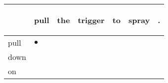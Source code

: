 \documentclass[landscape]{article}
\newcommand{\ssp}{\hspace{2pt}}
\newcommand{\mex}{\cellcolor{g}$\bullet$}
\begin{document}
\noindent\begin{tabular}{|l|p{10pt}|p{10pt}|p{10pt}|p{10pt}|p{10pt}|p{10pt}|}
\hline
&\begin{sideways}\cellcolor{ref0}pull\hspace{12pt}\end{sideways}&\begin{sideways}\cellcolor{ref1}the\hspace{12pt}\end{sideways}&\begin{sideways}\cellcolor{ref2}trigger\hspace{12pt}\end{sideways}&\begin{sideways}\cellcolor{ref3}to\hspace{12pt}\end{sideways}&\begin{sideways}\cellcolor{ref4}spray\hspace{12pt}\end{sideways}&\begin{sideways}\cellcolor{ref5}.\hspace{12pt}\end{sideways}\\
\hline
\ssp \cellcolor{ref0}pull \ssp&\hspace{2pt}\mex&\hspace{2pt}&\hspace{2pt}&\hspace{2pt}&\hspace{2pt}&\hspace{2pt}\\
\hline
\ssp down \ssp&\hspace{2pt}&\hspace{2pt}&\hspace{2pt}&\hspace{2pt}&\hspace{2pt}&\hspace{2pt}\\
\hline
\ssp on \ssp&\hspace{2pt}&\hspace{2pt}&\hspace{2pt}&\hspace{2pt}&\hspace{2pt}&\hspace{2pt}\\

\end{tabular}
\end{document}
